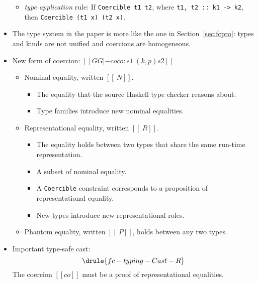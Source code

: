 \begin{itemize}
\begin{itemize}
  \item \textit{type application} rule: If \verb|Coercible t1 t2|,
    where \verb|t1, t2 :: k1 -> k2|,
    then \verb|Coercible (t1 x) (t2 x)|.
  \end{itemize}
\item The type system in the paper is more like the one in Section~\ref{sec:fcpro}:
  types and kinds are not unified and coercions are homogeneous.
\item New form of coercion: $[[GG |-co co : s1 ~ (k, p) s2]]$
  \begin{itemize}
  \item Nominal equality, written $[[~N]]$.
    \begin{itemize}
    \item The equality that the source Haskell type checker reasons about.
    \item Type families introduce new nominal equalities.
    \end{itemize}
  \item Representational equality, written $[[~R]]$.
    \begin{itemize}
    \item The equality holds between two types that share the same run-time representation.
    \item A subset of nominal equality.
    \item A \verb|Coercible| constraint corresponds to a proposition of
      representational equality.
    \item New types introduce new representational roles.
    \end{itemize}
  \item Phantom equality, written $[[~P]]$, holds between any two types.
  \end{itemize}
\item Important type-safe cast:
  \[ \drule{fc-typing-Cast-R} \]
  The coercion $[[co]]$ must be a proof of representational equalities.
\end{itemize}
